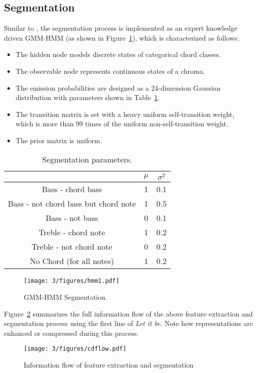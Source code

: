 \newpage
\subsection{Segmentation} \label{sec:3-chordino-like sg}
Similar to \cite{cannam2013mirex}, the segmentation process is implemented as an expert knowledge driven GMM-HMM (as shown in Figure~\ref{fig:3-hmm1}), which is characterized as follows:
\begin{itemize}
\item The hidden node models discrete states of categorical chord classes.
\item The observable node represents continuous states of a chroma.
\item The emission probabilities are designed as a 24-dimension Gaussian distribution with parameters shown in Table~\ref{tab:3-gaussian}.
\item The transition matrix is set with a heavy uniform self-transition weight, which is more than 99 times of the uniform non-self-transition weight. 
\item The prior matrix is uniform.
\end{itemize}

\begin{table}
\caption{Segmentation parameters.}
\centering
\footnotesize
\begin{tabular}{|c|c|c|} \hline
      & $\mu$ & $\sigma^2$ \\ \hline
 Bass - chord bass & 1 & 0.1 \\ \hline
 Bass - not chord bass but chord note & 1 & 0.5  \\ \hline
 Bass - not bass & 0 & 0.1 \\ \hline
 Treble - chord note & 1 & 0.2  \\ \hline
 Treble - not chord note & 0 & 0.2 \\ \hline
 No Chord (for all notes)  & 1 & 0.2  \\ \hline
\end{tabular}
\label{tab:3-gaussian}
\end{table}

\begin{figure}[htb]
\centering
\texttt{[image: 3/figures/hmm1.pdf]}
\caption{GMM-HMM Segmentation.}
\label{fig:3-hmm1}
\end{figure}

Figure~\ref{fig:3-cdflow} summarizes the full information flow of the above feature extraction and segmentation process using the first line of {\it Let it be}. Note how representations are enhanced or compressed during this process.
\begin{figure}[h]
\centering
\texttt{[image: 3/figures/cdflow.pdf]}
\caption{Information flow of feature extraction and segmentation}
\label{fig:3-cdflow}
\end{figure}


